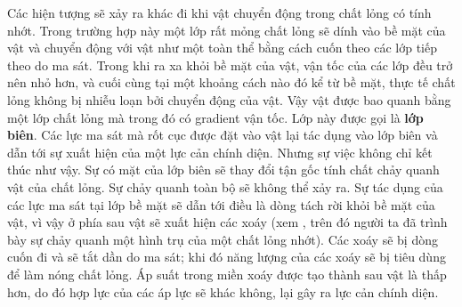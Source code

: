 
Các hiện tượng sẽ xảy ra khác đi khi vật chuyển động trong chất lỏng có tính nhớt. Trong trường hợp này một lớp rất mỏng chất lỏng sẽ dính vào bề mặt của vật và chuyển động với vật như một toàn thể bằng cách cuốn theo các lớp tiếp theo do ma sát. Trong khi ra xa khỏi bề mặt của vật, vận tốc của các lớp đều trở nên nhỏ hơn, và cuối cùng tại một khoảng cách nào đó kể từ bề mặt, thực tế chất lỏng không bị nhiễu loạn bởi chuyển động của vật. Vậy vật được bao quanh bằng một lớp chất lỏng mà trong đó có gradient vận tốc. Lớp này được gọi là \textbf{lớp biên}. Các lực ma sát mà rốt cục được đặt vào vật lại tác dụng vào lớp biên và dẫn tới sự xuất hiện của một lực cản chính diện. Nhưng sự việc không chỉ kết thúc như vậy. Sự có mặt của lớp biên sẽ thay đổi tận gốc tính chất chảy quanh vật của chất lỏng. Sự chảy quanh toàn bộ sẽ không thể xảy ra. Sự tác dụng của các lực ma sát tại lớp bề mặt sẽ dẫn tới điều là dòng tách rời khỏi bề mặt của vật, vì vậy ở phía sau vật sẽ xuất hiện các xoáy (xem , trên đó người ta đã trình bày sự chảy quanh một hình trụ của một chất lỏng nhớt). Các xoáy sẽ bị dòng cuốn đi và sẽ tắt dần do ma sát; khi đó năng lượng của các xoáy sẽ bị tiêu dùng để làm nóng chất lỏng. Áp suất trong miền xoáy được tạo thành sau vật là thấp hơn, do đó hợp lực của các áp lực sẽ khác không, lại gây ra lực cản chính diện.

